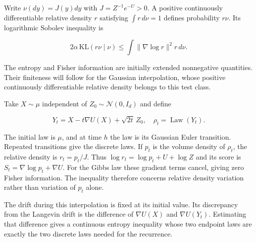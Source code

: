 \documentclass[11pt,a4paper]{report}
\begin{document}
Write \(\nu(dy)=J(y)dy\) with \(J=Z^{-1}e^{-U}>0\). A positive continuously differentiable relative density \(r\) satisfying \(\int r\,d\nu=1\) defines probability \(r\nu\). Its logarithmic Sobolev inequality is

\[2\alpha\,\mathrm{KL}(r\nu\mid\nu)\le\int\|\nabla\log r\|^2r\,d\nu.\]

The entropy and Fisher information are initially extended nonnegative quantities. Their finiteness will follow for the Gaussian interpolation, whose positive continuously differentiable relative density belongs to this test class.



Take \(X\sim\mu\) independent of \(Z_0\sim\mathcal N(0,I_d)\) and define

\[Y_t=X-t\nabla U(X)+\sqrt{2t}\,Z_0,\quad\rho_t=\operatorname{Law}(Y_t).\]

The initial law is \(\mu\), and at time \(h\) the law is its Gaussian Euler transition. Repeated transitions give the discrete laws. If \(p_t\) is the volume density of \(\rho_t\), the relative density is \(r_t=p_t/J\). Thus \(\log r_t=\log p_t+U+\log Z\) and its score is \(S_t=\nabla\log p_t+\nabla U\). For the Gibbs law these gradient terms cancel, giving zero Fisher information. The inequality therefore concerns relative density variation rather than variation of \(p_t\) alone.



The drift during this interpolation is fixed at its initial value. Its discrepancy from the Langevin drift is the difference of \(\nabla U(X)\) and \(\nabla U(Y_t)\). Estimating that difference gives a continuous entropy inequality whose two endpoint laws are exactly the two discrete laws needed for the recurrence.
\end{document}
